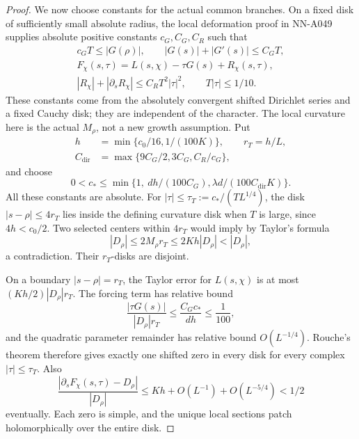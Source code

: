 \begin{proof}
We now choose constants for the actual common branches.
On a fixed disk of sufficiently small absolute radius,
the local deformation proof in NN-A049 supplies absolute
positive constants \(c_G,C_G,C_R\) such that
\[
 \begin{gathered}
 c_GT\le|G(\rho)|,\qquad |G(s)|+|G'(s)|\le C_GT,\\
 F_\chi(s,\tau)=L(s,\chi)-\tau G(s)+R_\chi(s,\tau),\\
 |R_\chi|+|\partial_sR_\chi|\le C_RT^2|\tau|^2,
                              \qquad T|\tau|\le1/10 .
 \end{gathered}
\]
These constants come from the absolutely convergent
shifted Dirichlet series and a fixed Cauchy disk; they
are independent of the character. The local curvature
here is the actual \(M_\rho\), not a new growth assumption.
Put
\begin{align*}
 h&=\min\{c_0/16,1/(100K)\},\qquad r_T=h/L,\\
 C_{\mathrm{dir}}&=\max\{9C_G/2,3C_G,C_R/c_G\},
\end{align*}
and choose
\[
 0<c_*\le
 \min\{1,\ dh/(100C_G),
                     \lambda d/(100C_{\mathrm{dir}}K)\}.
\]
All these constants are absolute.
For \(|\tau|\le\tau_T:=c_*/(TL^{1/4})\), the disk
\(|s-\rho|\le4r_T\) lies inside the defining curvature
disk when \(T\) is large, since \(4h<c_0/2\).
Two selected centers within \(4r_T\) would imply by
Taylor's formula
\[
              |D_\rho|\le2M_\rho r_T
                                  \le2Kh|D_\rho|<|D_\rho|,
\]
a contradiction. Their \(r_T\)-disks are disjoint.

On a boundary \(|s-\rho|=r_T\), the Taylor error for
\(L(s,\chi)\) is at most \((Kh/2)|D_\rho|r_T\).
The forcing term has relative bound
\[
       \frac{|\tau G(s)|}{|D_\rho|r_T}
                     \le\frac{C_Gc_*}{dh}\le\frac1{100},
\]
and the quadratic parameter remainder has relative
bound \(O(L^{-1/4})\).
Rouche's theorem therefore gives exactly one shifted
zero in every disk for every complex \(|\tau|\le\tau_T\).
Also
\[
 \frac{|\partial_sF_\chi(s,\tau)-D_\rho|}{|D_\rho|}
       \le Kh+O(L^{-1})+O(L^{-5/4})<1/2
\]
eventually. Each zero is simple, and the unique local
sections patch holomorphically over the entire disk.


\end{proof}
